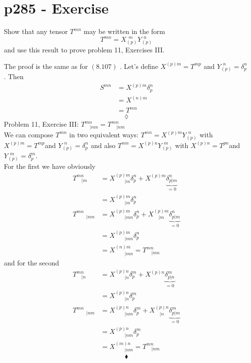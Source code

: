 \section{p285 - Exercise}
\begin{tcolorbox}
Show that any tensor $T^{mn}$ may be written in the form
$$T^{mn}=X_{(p)}^{\ \ m}Y_{(p)}^{\ \ n}$$
and use this result to prove problem 11, Exercises III.
\end{tcolorbox}
The proof is the same as for $\mathbf{(8.107)}$ . Let's define $X^{(p) m}_{}=T^{mp}$ and $Y^{\ \ n}_{(p)}= \delta^n_p$. Then 
\begin{align*}
S^{mn}&= X^{(p) m}_{} \delta^n_p\\
 &= X^{(n) m}_{}\\
 &=T^{mn}
\end{align*}
$$\lozenge$$
Problem 11, Exercise III: $ T^{mn}_{\quad | mn}= T^{mn}_{\quad | nm}$\\
We can compose $T^{mn}$ in two equivalent ways:   $T^{mn} = X^{(p) m}_{}Y^{\ \ n}_{(p)}$ with $X^{(p) m}_{}=T^{mp}$and $Y^{\ \ n}_{(p)}= \delta^n_p$ and also $T^{mn} = X^{(p) n}_{}Y^{\ \ m}_{(p)}$ with $X^{(p) n}_{}=T^{pn}$and $Y^{\ \ m}_{(p)}= \delta^m_p$. \\
For the first we have obviously
\begin{align*}
T^{mn}_{\quad | m}&= X^{(p) m}_{\quad \quad |m} \delta^n_p+ X^{(p) m}_{} \underbrace{\delta^n_{p|m}}_{=0}\\
&= X^{(p) m}_{\quad \quad | m} \delta^n_p\\
T^{mn}_{\quad \quad | mn}&= X^{(p) m}_{\quad \quad |mn} \delta^n_p+ X^{(p) m}_{\quad |m} \underbrace{\delta^n_{p|m}}_{=0}\\
&= X^{(p) m}_{\quad \quad |mn} \delta^n_p\\
&= X^{(n) m}_{\quad \quad |mn} 
= T^{mn}_{\quad | mn}
\end{align*}
and for the second 
\begin{align*}
T^{mn}_{\quad | n}&= X^{(p) n}_{\quad \quad |n} \delta^m_p+ X^{(p) n}_{} \underbrace{\delta^m_{p|n}}_{=0}\\
&= X^{(p) n}_{\quad \quad | n} \delta^m_p\\
T^{mn}_{\quad \quad | nm}&= X^{(p) n}_{\quad \quad |nm} \delta^m_p+ X^{(p) n}_{\quad |n} \underbrace{\delta^m_{p|m}}_{=0}\\
&= X^{(p) n}_{\quad \quad |nm} \delta^m_p\\
&= X^{(m) n}_{\quad \quad |nm} = T^{mn}_{\quad | nm}
\end{align*}
$$\blacklozenge$$
\newpage


